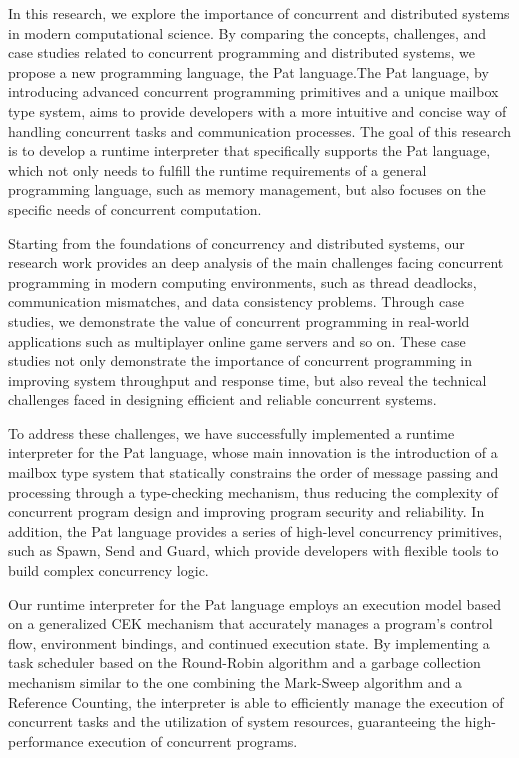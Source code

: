 \documentclass{l4proj}
\begin{document}
In this research, we explore the importance of concurrent and distributed systems in modern computational science. By comparing the concepts, challenges, and case studies related to concurrent programming and distributed systems, we propose a new programming language, the Pat language.The Pat language, by introducing advanced concurrent programming primitives and a unique mailbox type system, aims to provide developers with a more intuitive and concise way of handling concurrent tasks and communication processes. The goal of this research is to develop a runtime interpreter that specifically supports the Pat language, which not only needs to fulfill the runtime requirements of a general programming language, such as memory management, but also focuses on the specific needs of concurrent computation.

Starting from the foundations of concurrency and distributed systems, our research work provides an deep analysis of the main challenges facing concurrent programming in modern computing environments, such as thread deadlocks, communication mismatches, and data consistency problems. Through case studies, we demonstrate the value of concurrent programming in real-world applications such as multiplayer online game servers and so on. These case studies not only demonstrate the importance of concurrent programming in improving system throughput and response time, but also reveal the technical challenges faced in designing efficient and reliable concurrent systems.

To address these challenges, we have successfully implemented a runtime interpreter for the Pat language, whose main innovation is the introduction of a mailbox type system that statically constrains the order of message passing and processing through a type-checking mechanism, thus reducing the complexity of concurrent program design and improving program security and reliability. In addition, the Pat language provides a series of high-level concurrency primitives, such as Spawn, Send and Guard, which provide developers with flexible tools to build complex concurrency logic.

Our runtime interpreter for the Pat language employs an execution model based on a generalized CEK mechanism that accurately manages a program's control flow, environment bindings, and continued execution state. By implementing a task scheduler based on the Round-Robin algorithm and a garbage collection mechanism similar to the one combining the Mark-Sweep algorithm and a Reference Counting, the interpreter is able to efficiently manage the execution of concurrent tasks and the utilization of system resources, guaranteeing the high-performance execution of concurrent programs.
\end{document}
